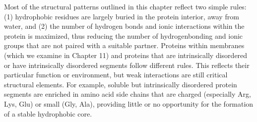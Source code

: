 Most of the structural patterns outlined in this chapter reflect two simple rules: (1) hydrophobic residues are largely buried in the protein interior, away from water, and (2) the number of hydrogen bonds and ionic interactions within the protein is maximized, thus reducing the number of hydrogenbonding and ionic groups that are not paired with a suitable partner. Proteins within membranes (which we examine in Chapter 11) and proteins that are intrinsically disordered or have intrinsically disordered segments follow different rules. This reflects their particular function or environment, but weak interactions are still critical structural elements. For example, soluble but intrinsically disordered protein segments are enriched in amino acid side chains that are charged (especially Arg, Lys, Glu) or small (Gly, Ala), providing little or no opportunity for the formation of a stable hydrophobic core. 


